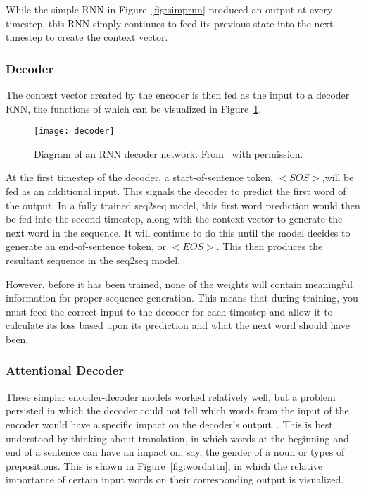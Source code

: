 While the simple RNN in Figure~\ref{fig:simprnn} produced an output at every timestep, this RNN simply continues to feed its previous state into the next timestep to create the context vector.

\subsubsection{Decoder}
The context vector created by the encoder is then fed as the input to a decoder RNN, the functions of which can be visualized in Figure~\ref{fig:decoder}.

\begin{figure}[h]
  \centering
  \texttt{[image: decoder]}
  \caption[Seq2seq decoder diagram]{Diagram of an RNN decoder network. From~\cite{Robertson2017} with permission.}
  \label{fig:decoder}
\end{figure}

At the first timestep of the decoder, a start-of-sentence token, $<SOS>$,will be fed as an additional input. This signals the decoder to predict the first word of the output. In a fully trained seq2seq model, this first word prediction would then be fed into the second timestep, along with the context vector to generate the next word in the sequence. It will continue to do this until the model decides to generate an end-of-sentence token, or $<EOS>$. This then produces the resultant sequence in the seq2seq model.

However, before it has been trained, none of the weights will contain meaningful information for proper sequence generation. This means that during training, you must feed the correct input to the decoder for each timestep and allow it to calculate its loss based upon its prediction and what the next word should have been.

\subsubsection{Attentional Decoder}
These simpler encoder-decoder models worked relatively well, but a problem persisted in which the decoder could not tell which words from the input of the encoder would have a specific impact on the decoder's output~\cite{Bahdanau2014}. This is best understood by thinking about translation, in which words at the beginning and end of a sentence can have an impact on, say, the gender of a noun or types of prepositions. This is shown in Figure~\ref{fig:wordattn}, in which the relative importance of certain input words on their corresponding output is visualized.

